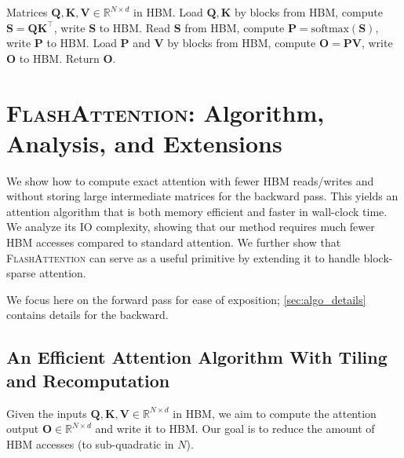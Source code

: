 \setcounter{algorithm}{-1}

\begin{algorithm}[H]
  \caption{\small\label{alg:standard_attn}Standard Attention Implementation}
  \begin{algorithmic}[1]
    \REQUIRE Matrices $\mathbf{Q}, \mathbf{K}, \mathbf{V} \in \mathbb{R}^{N \times d}$ in HBM.
    \STATE \label{alg:standard_attn_qk} Load $\mathbf{Q}, \mathbf{K}$ by blocks from HBM, compute
    $\mathbf{S} = \mathbf{Q} \mathbf{K}^\top$, write $\mathbf{S}$ to HBM.
    \STATE \label{alg:standard_attn_sp} Read $\mathbf{S}$ from HBM, compute $\mathbf{P} = \mathrm{softmax}(\mathbf{S})$, write $\mathbf{P}$ to HBM.
    \STATE \label{alg:standard_attn_pv} Load $\mathbf{P}$ and $\mathbf{V}$ by blocks from HBM, compute $\mathbf{O} = \mathbf{P}\mathbf{V}$, write $\mathbf{O}$ to HBM.
    \STATE Return $\mathbf{O}$.
  \end{algorithmic}
\end{algorithm}

\section{\textsc{FlashAttention}: Algorithm, Analysis, and Extensions}

\label{sec:algo}

We show how to compute exact attention with fewer HBM reads/writes and without storing large intermediate matrices for the backward pass. This yields an attention algorithm that is both memory efficient and faster in wall-clock time. We analyze its IO complexity, showing that our method requires much fewer HBM accesses compared to standard attention. We further show that \textsc{FlashAttention} can serve as a useful primitive by extending it to handle block-sparse attention.

We focus here on the forward pass for ease of exposition; \ref{sec:algo_details} contains details for the backward.

\subsection{An Efficient Attention Algorithm With Tiling and Recomputation}
\label{sec:implementation}

Given the inputs $\mathbf{Q}, \mathbf{K}, \mathbf{V} \in \mathbb{R}^{N \times d}$ in HBM, we aim to compute the attention output $\mathbf{O} \in \mathbb{R}^{N \times d}$ and write it to HBM. Our goal is to reduce the amount of HBM accesses (to sub-quadratic in $N$).

